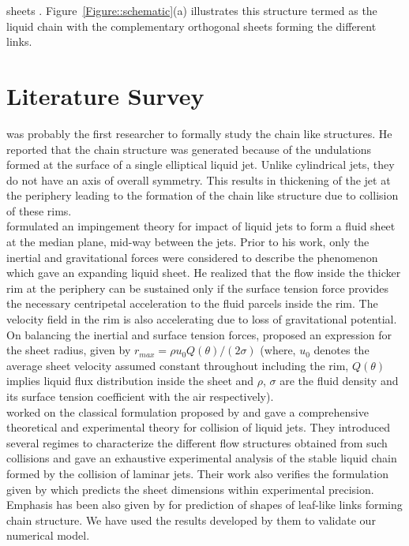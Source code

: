 sheets \citep{bush2004collision}. Figure~\ref{Figure::schematic}(a) illustrates this structure termed as the liquid chain with the complementary orthogonal sheets forming the different links. 
\section{Literature Survey}
\cite{rayleigh1879capillary,rayleigh1889tension} was probably the first researcher to formally study the chain like structures. He reported that the chain structure was generated because of the undulations formed at the surface of a single elliptical liquid jet. Unlike cylindrical jets, they do not have an axis of overall symmetry. This results in thickening of the jet at the periphery leading to the formation of the chain like structure due to collision of these rims.\\
\cite{taylor1960formation} formulated an impingement theory for impact of liquid jets to form a fluid sheet at the median plane, mid-way between the jets. Prior to his work, only the inertial and gravitational forces were considered to describe the phenomenon which gave an expanding liquid sheet. He realized that the flow inside the thicker rim at the periphery can be sustained only if the  surface tension force provides the necessary centripetal acceleration to the fluid parcels inside the rim. The velocity field in the rim is also accelerating due to loss of gravitational potential. On balancing the inertial and surface tension forces, \cite{taylor1960formation} proposed an expression for the sheet radius, given by $r_{max} = \rho u_0Q(\theta)/(2\sigma)$ (where, $u_0$ denotes the average sheet velocity assumed constant throughout including the rim, $Q(\theta)$ implies liquid flux distribution inside the sheet and $\rho$, $\sigma$ are the fluid density and its surface tension coefficient with the air respectively).\\
\cite{bush2004collision} worked on the classical formulation proposed by \cite{taylor1960formation} and gave a comprehensive theoretical and experimental theory for collision of liquid jets. They introduced several regimes to characterize the different flow structures obtained from such collisions and gave an exhaustive experimental analysis of the stable liquid chain formed by the collision of laminar jets. Their work also verifies the formulation given by \cite{taylor1960formation} which predicts the sheet dimensions within experimental precision. Emphasis has been also given by \cite{bush2004collision} for prediction of shapes of leaf-like links forming chain structure. We have used the results developed by them to validate our numerical model.\\
